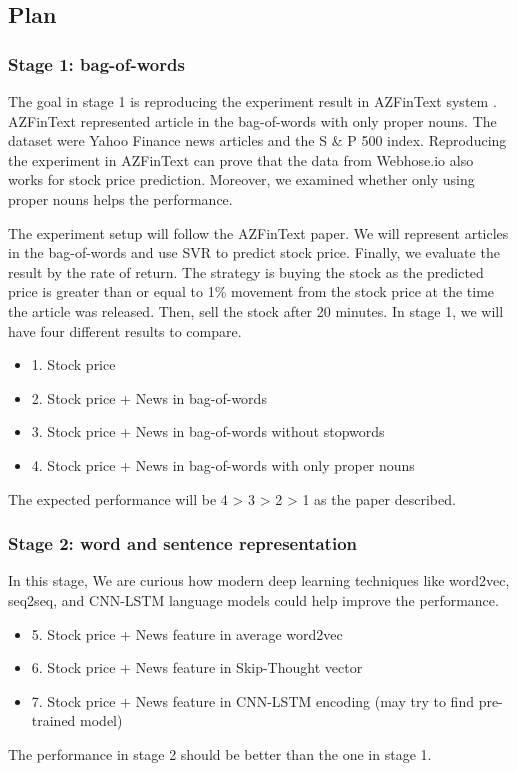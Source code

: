 \documentclass[sigconf]{acmart}
\begin{document}
\subsection{Plan}
\subsubsection{Stage 1: bag-of-words}
	The goal in stage 1 is reproducing the experiment result in AZFinText system \cite{AZFinText}. AZFinText represented article in the bag-of-words with only proper nouns. The
	dataset were Yahoo Finance news articles and the S \& P 500 index. Reproducing the experiment in AZFinText can prove that the data from Webhose.io also works for stock
	price prediction. Moreover, we examined whether only using proper nouns helps the performance.

	The experiment setup will follow the AZFinText paper. We will represent articles in the bag-of-words and use SVR to predict stock price. Finally, we evaluate the result by the rate of return.
	The strategy is buying the stock as the predicted price is greater than or equal to 1\% movement from the stock price at the time the article was released. Then, sell the stock after 20 minutes.
	In stage 1, we will have four different results to compare.
	\\
	\begin{itemize}
		\item 1. Stock price
		\item 2. Stock price + News in bag-of-words
		\item 3. Stock price + News in bag-of-words without stopwords
		\item 4. Stock price + News in bag-of-words with only proper nouns
	\end{itemize}
	The expected performance will be 4 > 3 > 2 > 1 as the paper described.

\subsubsection{Stage 2: word and sentence representation}
	In this stage, We are curious how modern deep learning techniques like word2vec, seq2seq, and CNN-LSTM language models could help improve the performance.  
	\begin{itemize}
		\item 5. Stock price + News feature in average word2vec \cite{word2vec1, word2vec2}
		\item 6. Stock price + News feature in Skip-Thought vector\cite{skip}
		\item 7. Stock price + News feature in CNN-LSTM encoding \cite{CNN2RNN} (may try to find pre-trained model)
	\end{itemize}
	The performance in stage 2 should be better than the one in stage 1.


 
\end{document}
